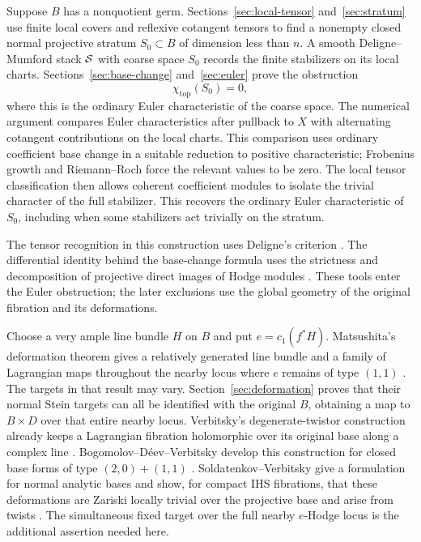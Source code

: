 Suppose \(B\) has a nonquotient germ. Sections~\ref{sec:local-tensor}
and~\ref{sec:stratum} use finite local covers and reflexive cotangent tensors
to find a nonempty closed normal projective stratum \(S_0\subset B\) of
dimension less than \(n\). A smooth Deligne--Mumford stack \(\mathcal S\) with coarse
space \(S_0\) records the finite stabilizers on its local charts.
Sections~\ref{sec:base-change} and~\ref{sec:euler} prove the obstruction
\[
                         \chi_{\mathrm{top}}(S_0)=0,
\]
where this is the ordinary Euler characteristic of the coarse space.
The numerical argument compares Euler characteristics after pullback to
\(X\) with alternating cotangent contributions on the local charts.
This comparison uses ordinary coefficient base change in a suitable
reduction to positive characteristic; Frobenius growth and Riemann--Roch
force the relevant values to be zero. The local tensor classification
then allows coherent coefficient modules to isolate the trivial character
of the full stabilizer. This recovers the ordinary Euler characteristic
of \(S_0\), including when some stabilizers act trivially on the stratum.

The tensor recognition in this construction uses Deligne's criterion
\cite[Theorem~7.1]{Deligne1990}. The differential identity behind the
base-change formula uses the strictness and decomposition of projective
direct images of Hodge modules \cite{Saito1988,Saito2016}. These tools enter the
Euler obstruction; the later exclusions use the global geometry of the
original fibration and its deformations.

Choose a very ample line bundle \(H\) on \(B\) and put \(e=c_1(f^*H)\).
Matsushita's deformation theorem gives a relatively generated line bundle
and a family of Lagrangian maps throughout the nearby locus where \(e\)
remains of type \((1,1)\)
\cite[Theorem~1.2 and Corollary~1.3]{MatsushitaDeformations2016}.
The targets in that result may vary. Section~\ref{sec:deformation} proves
that their normal Stein targets can all be identified with the original
\(B\), obtaining a map to \(B\times D\) over that entire nearby locus.
Verbitsky's degenerate-twistor construction already keeps a Lagrangian
fibration holomorphic over its original base along a complex line
\cite[Theorem~1.10]{Verbitsky2015}. Bogomolov--Déev--Verbitsky develop
this construction for closed base forms of type \((2,0)+(1,1)\)
\cite[Proposition~3.2 and Theorem~3.3]{BogomolovDeevVerbitsky2022}.
Soldatenkov--Verbitsky give a formulation for normal analytic bases and
show, for compact IHS fibrations, that these deformations are Zariski
locally trivial over the projective base and arise from twists
\cite[Section~2.2, Theorem~3.1 and Corollary~3.3]{SoldatenkovVerbitsky2025}.
The simultaneous fixed target over the full nearby \(e\)-Hodge locus is
the additional assertion needed here.

